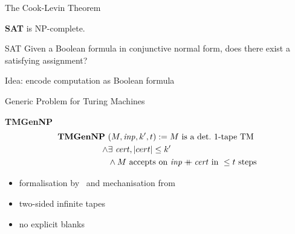 \documentclass[11pt,usenames,dvipsnames,
hyperref={pdfencoding=auto,psdextra}]{beamer}
\newcommand{\colorHTwo}{\color{blue}}
\newcommand{\colorTikzC}{blue}
\newcommand*{\gennp}{\textbf{TMGenNP}}
\newcommand{\NP}{\textsf{NP}}
\begin{document}
\newcommand{\SAT}{\textbf{SAT}}
\begin{frame}{The Cook-Levin Theorem}
  \begin{center}
    \SAT{} is \NP{}-complete. 
  \end{center}
  \vspace{2ex}
  \begin{block}{SAT}
    Given a Boolean formula in conjunctive normal form, does there exist a satisfying assignment?
  \end{block}
  \vspace{1ex}
  Idea: encode computation as Boolean formula\\[2ex]

  \begin{center}
\end{center}
\end{frame}

\begin{frame}{Generic Problem for Turing Machines}
  \begin{block}{\gennp{}}
    \vspace{-3ex}
    \begin{align*}
      \gennp{}~&(M, \mathit{inp}, k', t) := M \text{ is a det.\ 1-tape TM} \\
      \land & \exists~\mathit{cert}, \length{cert} \le k' \\
            & \land M \text{ accepts on } \mathit{inp}\concat\mathit{cert} \text{ in } \le t \text{ steps}
    \end{align*}
  \end{block}
  \begin{itemize}
    \item formalisation by~\cite{asperti_ricciotti} and mechanisation from~\cite{ForsterEtAl:2019:VerifiedTMs}
    \item two-sided infinite tapes
    \item no explicit blanks
  \end{itemize}
\end{frame}
\end{document}
